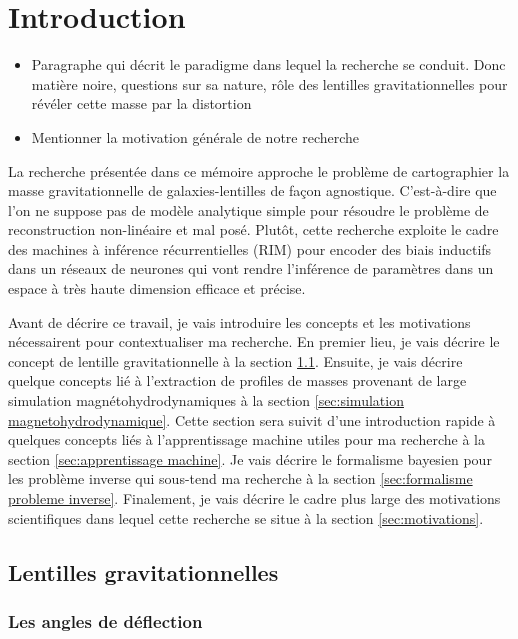 \chapter{Introduction}
\thispagestyle{empty}
\begin{itemize}
        \item Paragraphe qui décrit le paradigme dans lequel la recherche se conduit. 
                Donc matière noire, questions sur sa nature, rôle des 
                lentilles gravitationnelles pour révéler cette masse par la distortion
        \item Mentionner la motivation générale de notre recherche
\end{itemize}

La recherche présentée dans ce mémoire approche le problème de cartographier la 
masse gravitationnelle de galaxies-lentilles de façon agnostique. C'est-à-dire que 
l'on ne suppose pas de modèle analytique simple pour résoudre le problème 
de reconstruction non-linéaire et mal posé. Plutôt, cette recherche exploite 
le cadre des machines à inférence récurrentielles (RIM) pour encoder des biais 
inductifs dans un réseaux de neurones qui vont rendre l'inférence de 
paramètres dans un espace à très haute dimension efficace et précise.

Avant de décrire ce travail, je vais introduire les concepts 
et les motivations nécessairent pour contextualiser ma recherche.
En premier lieu, je vais décrire le concept de lentille 
gravitationnelle à la section \ref{sec:lentilles gravitationnelles}. Ensuite, 
je vais décrire quelque concepts lié à l'extraction de profiles de masses 
provenant de large simulation magnétohydrodynamiques à la section 
\ref{sec:simulation magnetohydrodynamique}. 
Cette section sera suivit d'une introduction rapide à quelques concepts liés 
à l'apprentissage machine utiles pour ma recherche
à la section \ref{sec:apprentissage machine}. 
Je vais décrire le formalisme bayesien pour les problème inverse 
qui sous-tend ma recherche à la section \ref{sec:formalisme probleme inverse}.
Finalement, je vais décrire le cadre plus large des motivations scientifiques 
dans lequel cette recherche se situe à la section \ref{sec:motivations}.


\section{Lentilles gravitationnelles}\label{sec:lentilles gravitationnelles}
\subsection{Les angles de déflection}

